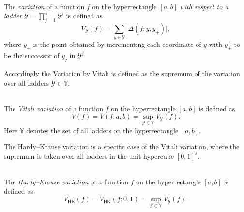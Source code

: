 \begin{definition} \ \\
    The \emph{variation} of a function $f$ on the hyperrectangle $[a,b]$
    \emph{with respect to a ladder}
    $\mathcal{Y} = \prod\limits_{j=1}^s \mathcal{Y}^j$ is defined as
    \begin{equation*}
        V_\mathcal{Y}(f) = \sum_{y \in \mathcal{Y}} \big| \Delta(f; y, y_+) \big|,
    \end{equation*}
    where $y_+$ is the point obtained by incrementing each coordinate of $y$
    with $y^j_+$ to be the successor of $y_j$ in $\mathcal{Y}^j$.
\end{definition}

Accordingly the Variation by Vitali is defined as the supremum of the variation
over all ladders $\mathcal{Y} \in \mathbb{Y}$.

\begin{definition} \ \\
    The \emph{Vitali variation} of a function $f$ on the hyperrectangle $[a,b]$
    is defined as
    \begin{equation*}
        V(f) = V(f; a, b) = \sup_{\mathcal{Y} \in \mathbb{Y}} V_\mathcal{Y}(f).
    \end{equation*}
    Here $\mathbb{Y}$ denotes the set of all ladders on the hyperrectangle
    $[a,b]$.
\end{definition}

The Hardy--Krause variation is a specific case of the Vitali variation, where
the supremum is taken over all ladders in the unit hypercube $[0,1]^s$.

\begin{definition} \ \\
    The \emph{Hardy--Krause variation} of a function $f$ on the hyperrectangle
    $[a,b]$ is defined as
    \begin{equation*}
        V_{\mathrm{HK}}(f) = V_{\mathrm{HK}}(f; 0, 1) = \sup_{\mathcal{Y} \in 
        \mathbb{Y}} V_\mathcal{Y}(f).
    \end{equation*}
\end{definition}






